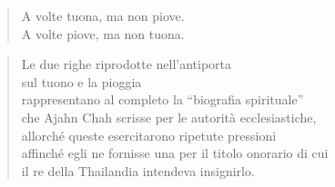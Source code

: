 \cleartorecto
\thispagestyle{empty}

\mbox{}
\vfill

\begin{quote}

A volte tuona, ma non piove.\\
A volte piove, ma non tuona.

\end{quote}

\begin{quote}

Le due righe riprodotte nell'antiporta\\
sul tuono e la pioggia\\
rappresentano al completo la ``biografia spirituale''\\
che Ajahn Chah scrisse per le autorità ecclesiastiche,\\
allorché queste esercitarono ripetute pressioni\\
affinché egli ne fornisse una per il titolo onorario di cui\\
il re della Thailandia intendeva insignirlo.

\end{quote}

\vfill
\mbox{}

